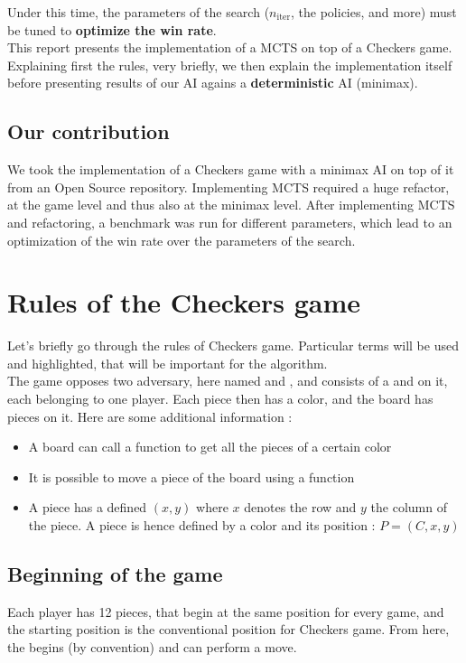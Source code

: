 \documentclass[11pt,a4paper]{article}
\begin{document}
Under this time, the parameters of the search ($n_{\text{iter}}$, the policies, and more) must be tuned to \textbf{optimize the win rate}. \\

This report presents the implementation of a MCTS on top of a Checkers game. Explaining first the rules, very briefly, we then explain the implementation itself before presenting results of our AI agains a \textbf{deterministic} AI (minimax).

\subsection{Our contribution}
We took the implementation of a Checkers game with a minimax AI on top of it from an Open Source repository. Implementing MCTS required a huge refactor, at the game level and thus also at the minimax level. After implementing MCTS and refactoring, a benchmark was run for different parameters, which lead to an optimization of the win rate over the parameters of the search.
\section{Rules of the Checkers game}
Let's briefly go through the rules of Checkers game. Particular terms will be used and highlighted, that will be important for the algorithm. \\

The game opposes two adversary, here named  and , and consists of a  and  on it, each belonging to one player. Each piece then has a color, and the board has pieces on it. Here are some additional information :
\begin{itemize}[label=$\blacktriangleright$]
    \item A board can call a function to get all the pieces of a certain color
    \item It is possible to move a piece of the board using a  function
    \item A piece has a defined  $(x,y)$ where $x$ denotes the row and $y$ the column of the piece. A piece is hence defined by a color and its position : $P = (C, x, y)$
\end{itemize}

\subsection{Beginning of the game}
Each player has 12 pieces, that begin at the same position for every game, and the starting position is the conventional position for Checkers game. From here, the  begins (by convention) and can perform a move.
\end{document}
